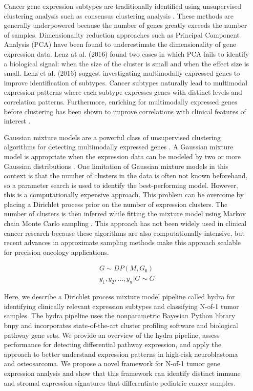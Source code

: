 \documentclass[10pt,letterpaper]{article}
\begin{document}
Cancer gene expression subtypes are traditionally identified using unsupervised clustering analysis such as consensus clustering analysis \cite{oyeladeClusteringAlgorithmsTheir2016,johnM3CMonteCarlo2018,wilkersonConsensusClusterPlusClassDiscovery2010}. These methods are generally underpowered because the number of genes greatly exceeds the number of samples. Dimensionality reduction approaches such as Principal Component Analysis (PCA) have been found to underestimate the dimensionality of gene expression data. Lenz at al. (2016) found two cases in which PCA fails to identify a biological signal: when the size of the cluster is small and when the effect size is small. Lenz et al. (2016) suggest investigating multimodally expressed genes to improve identification of subtypes. Cancer subtypes naturally lead to multimodal expression patterns where each subtype expresses genes with distinct levels and correlation patterns. Furthermore, enriching for multimodally expressed genes before clustering has been shown to improve correlations with clinical features of interest \cite{yiliMultimodalityCriterionFeature2005}.

Gaussian mixture models are a powerful class of unsupervised clustering algorithms for detecting multimodally expressed genes \cite{ghoshMixtureModelsAssessing2004}. A Gaussian mixture model is appropriate when the expression data can be modeled by two or more Gaussian distributions \cite{gelman2013bayesian}. One limitation of Gaussian mixture models in this context is that the number of clusters in the data is often not known beforehand, so a parameter search is used to identify the best-performing model. However, this is a computationally expensive approach. This problem can be overcome by placing a Dirichlet process prior on the number of expression clusters. The number of clusters is then inferred while fitting the mixture model using Markov chain Monte Carlo sampling \cite{gelman2013bayesian}. This approach has not been widely used in clinical cancer research because these algorithms are also computationally intensive, but recent advances in approximate sampling methods make this approach scalable for precision oncology applications.

\begin{eqnarray}
\label{eq:dpgmm}
G \sim DP(M, G_0) \\
y_1, y_2, ..., y_n | G \sim G
\end{eqnarray}

Here, we describe a Dirichlet process mixture model pipeline called hydra for identifying clinically relevant expression subtypes and classifying N-of-1 tumor samples. The hydra pipeline uses the nonparametric Bayesian Python library bnpy \cite{hughesBnpyReliableScalable} and incorporates state-of-the-art cluster profiling software and biological pathway gene sets. We provide an overview of the hydra pipeline, assess performance for detecting differential pathway expression, and apply the approach to better understand expression patterns in high-risk neuroblastoma and osteosarcoma. We propose a novel framework for N-of-1 tumor gene expression analysis and show that this framework can identify distinct immune and stromal expression signatures that differentiate pediatric cancer samples.
\end{document}
